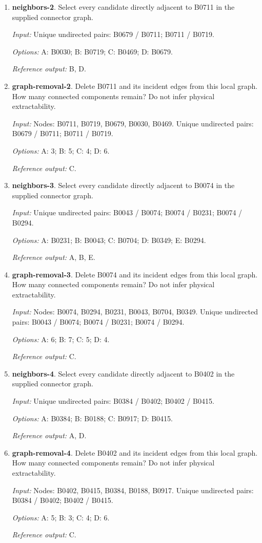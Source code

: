 \begin{enumerate}
\item \textbf{neighbors-2}. Select every candidate directly adjacent to B0711 in the supplied connector graph.\par {\small \textit{Input:} Unique undirected pairs: B0679 / B0711; B0711 / B0719. \par\textit{Options:} A: B0030; B: B0719; C: B0469; D: B0679. \par\textit{Reference output:} B, D.}
\item \textbf{graph-removal-2}. Delete B0711 and its incident edges from this local graph. How many connected components remain? Do not infer physical extractability.\par {\small \textit{Input:} Nodes: B0711, B0719, B0679, B0030, B0469. Unique undirected pairs: B0679 / B0711; B0711 / B0719. \par\textit{Options:} A: 3; B: 5; C: 4; D: 6. \par\textit{Reference output:} C.}
\item \textbf{neighbors-3}. Select every candidate directly adjacent to B0074 in the supplied connector graph.\par {\small \textit{Input:} Unique undirected pairs: B0043 / B0074; B0074 / B0231; B0074 / B0294. \par\textit{Options:} A: B0231; B: B0043; C: B0704; D: B0349; E: B0294. \par\textit{Reference output:} A, B, E.}
\item \textbf{graph-removal-3}. Delete B0074 and its incident edges from this local graph. How many connected components remain? Do not infer physical extractability.\par {\small \textit{Input:} Nodes: B0074, B0294, B0231, B0043, B0704, B0349. Unique undirected pairs: B0043 / B0074; B0074 / B0231; B0074 / B0294. \par\textit{Options:} A: 6; B: 7; C: 5; D: 4. \par\textit{Reference output:} C.}
\item \textbf{neighbors-4}. Select every candidate directly adjacent to B0402 in the supplied connector graph.\par {\small \textit{Input:} Unique undirected pairs: B0384 / B0402; B0402 / B0415. \par\textit{Options:} A: B0384; B: B0188; C: B0917; D: B0415. \par\textit{Reference output:} A, D.}
\item \textbf{graph-removal-4}. Delete B0402 and its incident edges from this local graph. How many connected components remain? Do not infer physical extractability.\par {\small \textit{Input:} Nodes: B0402, B0415, B0384, B0188, B0917. Unique undirected pairs: B0384 / B0402; B0402 / B0415. \par\textit{Options:} A: 5; B: 3; C: 4; D: 6. \par\textit{Reference output:} C.}

\end{enumerate}

